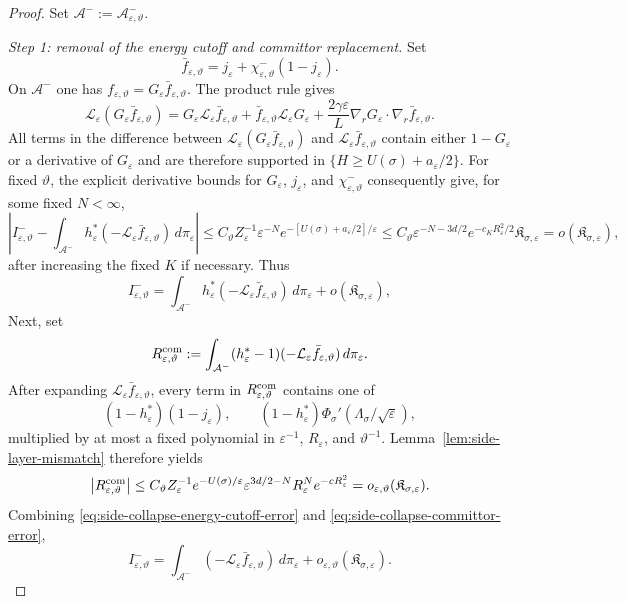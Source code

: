 \documentclass[11pt]{article}
\numberwithin{equation}{section}
\theoremstyle{plain}
\theoremstyle{definition}
\theoremstyle{remark}
\newcommand{\eps}{\varepsilon}
\newcommand{\calL}{\mathcal L}
\begin{document}
\begin{proof}
Set $\mathcal A^-:=\mathcal A_{\eps,\vartheta}^-$.

\emph{Step 1: removal of the energy cutoff and committor replacement.}
Set
\[
\bar f_{\eps,\vartheta}
=j_\eps+\chi_{\eps,\vartheta}^-(1-j_\eps).
\]
On $\mathcal A^-$ one has $f_{\eps,\vartheta}=G_\eps\bar f_{\eps,\vartheta}$.
The product rule gives
\[
\calL_\eps(G_\eps\bar f_{\eps,\vartheta})
=G_\eps\calL_\eps\bar f_{\eps,\vartheta}
+\bar f_{\eps,\vartheta}\calL_\eps G_\eps
+\frac{2\gamma\eps}{L}
\nabla_rG_\eps\cdot\nabla_r\bar f_{\eps,\vartheta}.
\]
All terms in the difference between
$\calL_\eps(G_\eps\bar f_{\eps,\vartheta})$ and
$\calL_\eps\bar f_{\eps,\vartheta}$ contain either $1-G_\eps$ or a derivative
of $G_\eps$ and are therefore supported in
$\{H\ge U(\sigma)+a_\eps/2\}$.  For fixed $\vartheta$, the explicit derivative
bounds for $G_\eps$, $j_\eps$, and $\chi_{\eps,\vartheta}^-$ consequently give, for some
fixed $N<\infty$,
\[
\left|I^-_{\eps,\vartheta}
-\int_{\mathcal A^-}h_\eps^*
(-\calL_\eps\bar f_{\eps,\vartheta})\,d\pi_\eps\right|
\le
C_\vartheta Z_\eps^{-1}\eps^{-N}
e^{-[U(\sigma)+a_\eps/2]/\eps}
\le C_\vartheta\eps^{-N-3d/2}e^{-c_KR_\eps^2/2}
\mathfrak K_{\sigma,\eps}
=o(\mathfrak K_{\sigma,\eps}),
\]
after increasing the fixed $K$ if necessary.  Thus
\begin{equation}
\label{eq:side-collapse-energy-cutoff-error}
I^-_{\eps,\vartheta}
=\int_{\mathcal A^-}h_\eps^*(-\calL_\eps \bar f_{\eps,\vartheta})\,d\pi_\eps
+o(\mathfrak K_{\sigma,\eps}),
\end{equation}
Next, set
\[
R^{\rm com}_{\eps,\vartheta}
:=\int_{\mathcal A^-}(h_\eps^*-1)
(-\calL_\eps\bar f_{\eps,\vartheta})\,d\pi_\eps.
\]
After expanding $\calL_\eps\bar f_{\eps,\vartheta}$, every term in
$R^{\rm com}_{\eps,\vartheta}$ contains one of
\[
(1-h_\eps^*)(1-j_\eps),
\qquad
(1-h_\eps^*)\Phi_\sigma'(\Lambda_\sigma/\sqrt\eps),
\]
multiplied by at most a fixed polynomial in
$\eps^{-1}$, $R_\eps$, and $\vartheta^{-1}$.
Lemma~\ref{lem:side-layer-mismatch} therefore yields
\begin{equation}
\label{eq:side-collapse-committor-error}
\left|R^{\rm com}_{\eps,\vartheta}\right|
\le
C_\vartheta Z_\eps^{-1}e^{-U(\sigma)/\eps}
\eps^{3d/2-N}R_\eps^N e^{-cR_\eps^2}
=o_{\eps,\vartheta}(\mathfrak K_{\sigma,\eps}).
\end{equation}
Combining \eqref{eq:side-collapse-energy-cutoff-error} and
\eqref{eq:side-collapse-committor-error},
\begin{equation}
\label{eq:side-collapse-component-replacement}
I^-_{\eps,\vartheta}
=\int_{\mathcal A^-}(-\calL_\eps\bar f_{\eps,\vartheta})\,d\pi_\eps
+o_{\eps,\vartheta}(\mathfrak K_{\sigma,\eps}).
\end{equation}


\end{proof}
\end{document}
